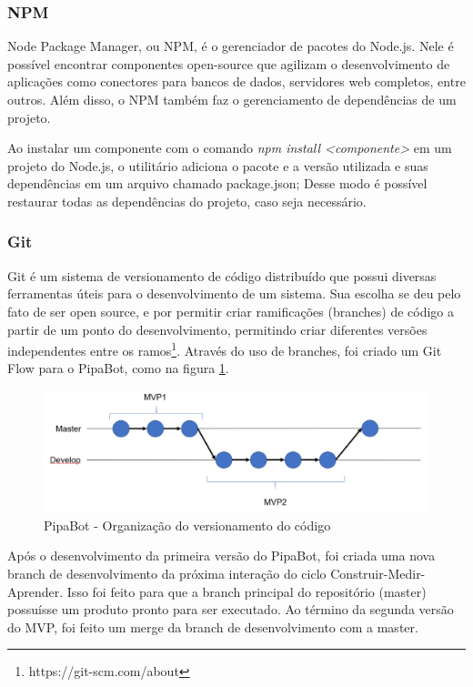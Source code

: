   \subsubsection{NPM}
  Node Package Manager, ou NPM, é o gerenciador de pacotes do Node.js. Nele é possível encontrar componentes open-source que agilizam o desenvolvimento de aplicações como conectores para bancos de dados, servidores web completos, entre outros. Além disso, o NPM também faz o gerenciamento de dependências de um projeto.
  
  Ao instalar um componente com o comando \emph{npm install <componente>} em um projeto do Node.js, o utilitário adiciona o pacote e a versão utilizada e suas dependências em um arquivo chamado package.json;  
  Desse modo é possível restaurar todas as dependências do projeto, caso seja necessário.
  
  \subsubsection{Git}
  Git é um sistema de versionamento de código distribuído que possui diversas ferramentas úteis para o desenvolvimento de um sistema. Sua escolha se deu pelo fato de ser open source, e por permitir criar ramificações (branches) de código a partir de um ponto do desenvolvimento, permitindo criar diferentes versões independentes entre os ramos\footnote{https://git-scm.com/about}. Através do uso de branches, foi criado um Git Flow para o PipaBot, como na figura \ref{fig:gitflow}.
  
  \begin{figure}[h!]
  	\begin{center}
  		\includegraphics[width=1\linewidth]{images/git_flow.png}
  		\caption{PipaBot - Organização do versionamento do código}
  		\label{fig:gitflow}
  	\end{center}
  \end{figure}
  
  Após o desenvolvimento da primeira versão do PipaBot, foi criada uma nova branch de desenvolvimento da próxima interação do ciclo Construir-Medir-Aprender. Isso foi feito para que a branch principal do repositório (master) possuísse um produto pronto para ser executado. Ao término da segunda versão do MVP, foi feito um merge da branch de desenvolvimento com a master.
  
